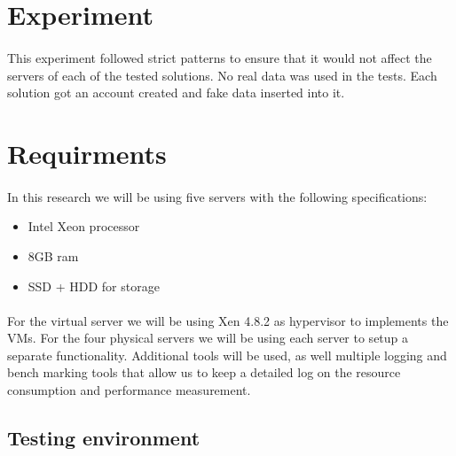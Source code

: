\section{Experiment}
\paragraph{}
This experiment followed strict patterns to ensure that it would not affect the servers of each of the tested solutions. No real data was used in the tests. Each solution got an account created and fake data inserted into it.


\section{Requirments}
\paragraph{}
In this research we will be using five servers with the following specifications:

\begin{itemize}
	\item Intel Xeon processor
	\item 8GB ram
	\item SSD + HDD for storage
\end{itemize}

\paragraph{}
For the virtual server we will be using Xen 4.8.2 as hypervisor to implements the VMs. For the four physical servers we will be using each server to setup a separate functionality. Additional tools will be used, as well multiple logging and bench marking tools that allow us to keep a detailed log on the resource consumption and performance measurement.

\subsection{Testing environment}
